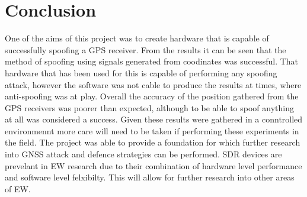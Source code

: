 
\chapter{Conclusion} %

\label{Chapter7} %

One of the aims of this project was to create hardware that is capable of successfully spoofing a GPS receiver. From the results it can be seen that the method of
spoofing using signals generated from coodinates was successful. That hardware that has been used for this is capable of performing any spoofing attack, however the
software was not cable to produce the results at times, where anti-spoofing was at play.
Overall the accuracy of the position gathered from the GPS receivers was poorer than expected, although
to be able to spoof anything at all was considered a success. Given these results were gathered in a conntrolled environmennt more care will need to be taken if
performing these experiments in the field. The project was able to provide a foundation for which further research into GNSS attack and defence strategies can be
performed. SDR devices are prevelant in EW research due to their combination of hardware level performance and software level felxibilty. This will allow for further
research into other areas of EW.